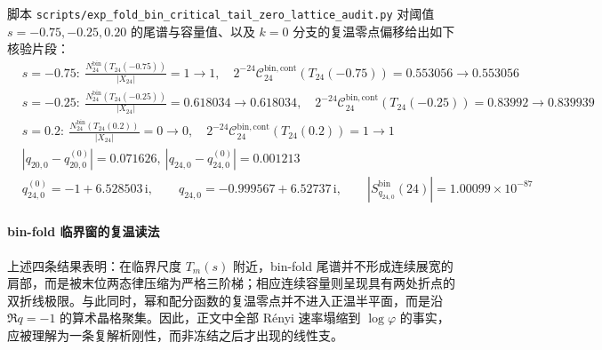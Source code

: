 \begin{remark}[临界尾谱与复温零点的数值锚点]\label{rem:xi-foldbin-critical-tail-zero-lattice-audit}
脚本 \texttt{scripts/exp\_fold\_bin\_critical\_tail\_zero\_lattice\_audit.py} 对阈值 \(s=-0.75,-0.25,0.20\) 的尾谱与容量值、以及 \(k=0\) 分支的复温零点偏移给出如下核验片段：
\begin{equation}\label{eq_fold_bin_critical_tail_zero_lattice_audit}
\begin{aligned}
&s=-0.75:\ \frac{N_{24}^{\mathrm{bin}}(T_{24}(-0.75))}{|X_{24}|}=1\to 1,\quad 2^{-24}\mathcal C_{24}^{\mathrm{bin,cont}}(T_{24}(-0.75))=0.553056\to 0.553056\\
&s=-0.25:\ \frac{N_{24}^{\mathrm{bin}}(T_{24}(-0.25))}{|X_{24}|}=0.618034\to 0.618034,\quad 2^{-24}\mathcal C_{24}^{\mathrm{bin,cont}}(T_{24}(-0.25))=0.83992\to 0.839939\\
&s=0.2:\ \frac{N_{24}^{\mathrm{bin}}(T_{24}(0.2))}{|X_{24}|}=0\to 0,\quad 2^{-24}\mathcal C_{24}^{\mathrm{bin,cont}}(T_{24}(0.2))=1\to 1\\
&|q_{20,0}-q_{20,0}^{(0)}|=0.071626,\ |q_{24,0}-q_{24,0}^{(0)}|=0.001213\\
&q_{24,0}^{(0)}=-1+6.528503\,\mathrm{i},\qquad q_{24,0}=-0.999567+6.52737\,\mathrm{i},\qquad |S_{q_{24,0}}^{\mathrm{bin}}(24)|=1.00099\times 10^{-87}
\end{aligned}
\end{equation}
\end{remark}

\paragraph{bin-fold 临界窗的复温读法}
上述四条结果表明：在临界尺度 \(T_m(s)\) 附近，bin-fold 尾谱并不形成连续展宽的肩部，而是被末位两态律压缩为严格三阶梯；相应连续容量则呈现具有两处折点的双折线极限。与此同时，幂和配分函数的复温零点并不进入正温半平面，而是沿 \(\Re q=-1\) 的算术晶格聚集。因此，正文中全部 Rényi 速率塌缩到 \(\log\varphi\) 的事实，应被理解为一条复解析刚性，而非冻结之后才出现的线性支。

\endinput
